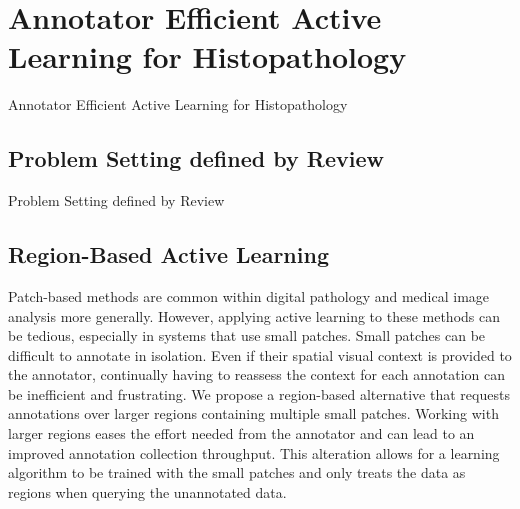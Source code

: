 \section{Annotator Efficient Active Learning for Histopathology}
Annotator Efficient Active Learning for Histopathology

\subsection{Problem Setting defined by Review}
Problem Setting defined by Review

\subsection{Region-Based Active Learning}
Patch-based methods are common within digital pathology and medical image analysis more generally. However, applying active learning to these methods can be tedious, especially in systems that use small patches. Small patches can be difficult to annotate in isolation. Even if their spatial visual context is provided to the annotator, continually having to reassess the context for each annotation can be inefficient and frustrating.  We propose a region-based alternative that requests annotations over larger regions containing multiple small patches. Working with larger regions eases the effort needed from the annotator and can lead to an improved annotation collection throughput. This alteration allows for a learning algorithm to be trained with the small patches and only treats the data as regions when querying the unannotated data.

